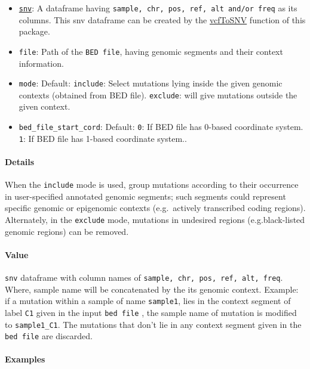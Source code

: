 \documentclass[]{article}
\providecommand{\tightlist}{%
  \setlength{\itemsep}{0pt}\setlength{\parskip}{0pt}}
\let\oldparagraph\paragraph
\renewcommand{\paragraph}[1]{\oldparagraph{#1}\mbox{}}
\begin{document}
\begin{itemize}
\tightlist
\item
  \protect\hyperlink{snv}{\texttt{snv}}: A dataframe having
  \texttt{sample,\ chr,\ pos,\ ref,\ alt\ and/or\ freq} as its columns.
  This snv dataframe can be created by the
  \protect\hyperlink{vcfToSNV}{vcfToSNV} function of this package.
\item
  \texttt{file}: Path of the \texttt{BED\ file}, having genomic segments
  and their context information.
\item
  \texttt{mode}: Default: \texttt{include}: Select mutations lying
  inside the given genomic contexts (obtained from BED file).
  \texttt{exclude}: will give mutations outside the given context.
\item
  \texttt{bed\_file\_start\_cord}: Default: \texttt{0}: If BED file has 0-based coordinate system. \texttt{1}: If BED file has 1-based coordinate system..
  
\end{itemize}

\paragraph{\texorpdfstring{\textbf{Details}}{Details}}\label{details-1}

When the \texttt{include} mode is used, group mutations according to
their occurrence in user-specified annotated genomic segments; such
segments could represent specific genomic or epigenomic contexts
(e.g.~actively transcribed coding regions). Alternately, in the
\texttt{exclude} mode, mutations in undesired regions (e.g.black-listed
genomic regions) can be removed.

\paragraph{\texorpdfstring{\textbf{Value}}{Value}}\label{value}

\texttt{snv} dataframe with column names of
\texttt{sample,\ chr,\ pos,\ ref,\ alt,\ freq}. Where, sample name will
be concatenated by the its genomic context. Example: if a mutation
within a sample of name \texttt{sample1}, lies in the context segment of
label \texttt{C1} given in the input \texttt{bed\ file} , the sample
name of mutation is modified to \texttt{sample1\_C1}. The mutations that
don't lie in any context segment given in the \texttt{bed\ file} are
discarded.

\paragraph{\texorpdfstring{\textbf{Examples}}{Examples}}\label{examples-1}
\end{document}
